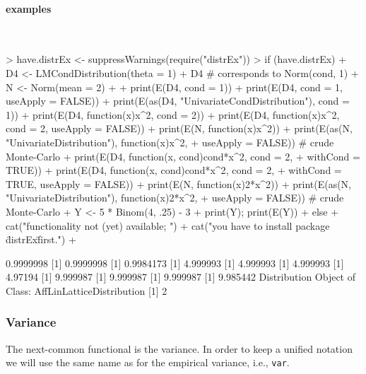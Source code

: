 \documentclass[11pt]{article}
\newcommand{\code}[1]{{\tt #1}}
\begin{document}
\paragraph{examples} $ \mbox{ }$\newline
\begin{Schunk}
\begin{Sinput}
> have.distrEx <- suppressWarnings(require("distrEx"))
> if (have.distrEx)
+     {D4 <- LMCondDistribution(theta = 1)
+      D4  # corresponds to Norm(cond, 1)
+      N <- Norm(mean = 2)
+
+      print(E(D4, cond = 1))
+      print(E(D4, cond = 1, useApply = FALSE))
+      print(E(as(D4, "UnivariateCondDistribution"), cond = 1))
+      print(E(D4, function(x){x^2}, cond = 2))
+      print(E(D4, function(x){x^2}, cond = 2, useApply = FALSE))
+      print(E(N, function(x){x^2}))
+      print(E(as(N, "UnivariateDistribution"), function(x){x^2},
+        useApply = FALSE)) # crude Monte-Carlo
+      print(E(D4, function(x, cond){cond*x^2}, cond = 2,
+        withCond = TRUE))
+      print(E(D4, function(x, cond){cond*x^2}, cond = 2,
+        withCond = TRUE, useApply = FALSE))
+      print(E(N, function(x){2*x^2}))
+      print(E(as(N, "UnivariateDistribution"), function(x){2*x^2},
+        useApply = FALSE)) # crude Monte-Carlo
+      Y <- 5 * Binom(4, .25) - 3
+      print(Y); print(E(Y))
+     } else {
+     cat("\n functionality not (yet) available; ")
+     cat("you have to install package \"distrEx\" first.\n")
+     }
\end{Sinput}
\begin{Soutput}
[1] 0.9999998
[1] 0.9999998
[1] 0.9984173
[1] 4.999993
[1] 4.999993
[1] 4.999993
[1] 4.97194
[1] 9.999987
[1] 9.999987
[1] 9.999987
[1] 9.985442
Distribution Object of Class: AffLinLatticeDistribution
[1] 2
\end{Soutput}
\end{Schunk}
%
%
\subsubsection{Variance}
The next-common functional is the variance. In order to keep a unified
notation we will use the same name as for the empirical variance, i.e.,
 \code{var}.
\end{document}
